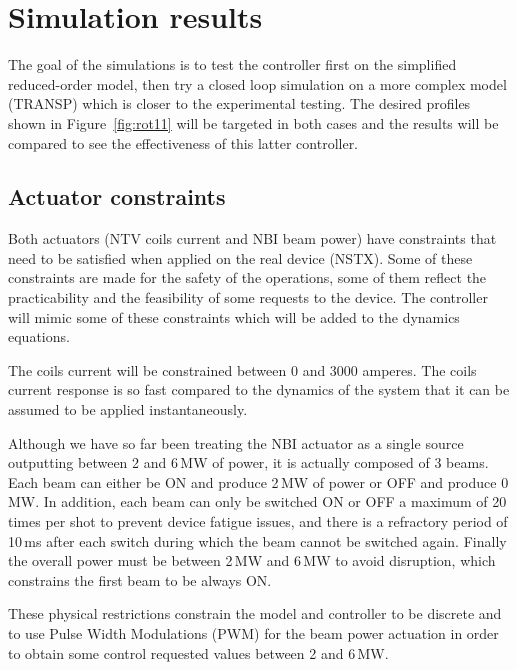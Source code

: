 \documentclass[12pt]{iopart}
\begin{document}
\clearpage


\section{Simulation results} 
The goal of the simulations is to test the controller first on the simplified reduced-order model, then try a closed loop simulation on a more complex model (TRANSP) which is closer to the experimental testing.  The desired profiles shown in Figure~\ref{fig:rot11} will be targeted in both cases and the results will be compared to see the effectiveness of  this latter controller.

\subsection{Actuator constraints}
\label{constraints}

Both actuators (NTV coils current and NBI beam power) have constraints that need to be satisfied when applied on the real device (NSTX). Some of these constraints are made for the safety of the operations, some of them reflect the practicability and the feasibility of some requests to the device. The controller will mimic some of these constraints which will be added to the dynamics equations.

The coils current will be constrained between 0 and 3000 amperes.
The coils current response is so fast compared to the dynamics of the system that it can be assumed to be applied instantaneously.

Although we have so far been treating the NBI actuator as a single source outputting between 2 and 6\,MW of power, it is actually composed of 3 beams. Each beam can either be ON and produce 2\,MW of power or OFF and produce 0\,MW.
In addition, each beam can only be switched ON or OFF a maximum of 20 times per shot to prevent device fatigue issues, and there is a refractory period of 10\,ms after each switch during which the beam cannot be switched again.
Finally the overall power must be between 2\,MW and 6\,MW to avoid disruption, which constrains the first beam to be always ON.

These physical restrictions constrain the model and controller to be discrete and to use Pulse Width Modulations (PWM) for the beam power actuation in order to obtain some control requested values between 2 and 6\,MW.

\end{document}
